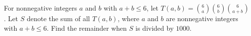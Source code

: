 For nonnegative integers $a$ and $b$ with  $a + b \leq 6$, let $T(a, b) = \binom{6}{a} \binom{6}{b} \binom{6}{a + b}$. Let $S$ denote the sum of all $T(a, b)$, where $a$ and $b$ are nonnegative integers with $a + b \leq 6$. Find the remainder when $S$ is divided by $1000$.